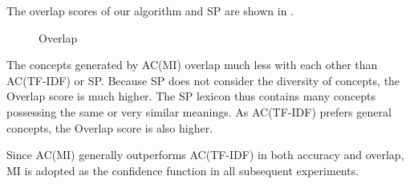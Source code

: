 The overlap scores of our algorithm and SP are shown in .

\begin{figure}[th]
\centering
{}
\caption{Overlap}
\label{fig:overlap_ngram}
\end{figure}

The concepts generated by AC(MI) overlap much less with each other than
AC(TF-IDF) or SP. Because SP does not consider the diversity of concepts,
the Overlap score is much higher. The SP lexicon thus contains many concepts
possessing the same or very similar meanings.
As AC(TF-IDF) prefers general concepts, the Overlap score is also
higher.

Since AC(MI) generally outperforms AC(TF-IDF) in both accuracy and
overlap, MI is adopted as the confidence function in all subsequent experiments.



